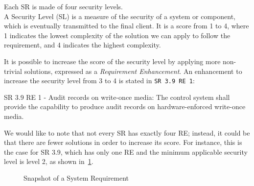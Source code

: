 Each SR is made of four security levels. \\
A Security Level (SL) is a measure of the security of a system or component, which is eventually transmitted to the final client. It is a score from 1 to 4, where 1 indicates the lowest complexity of the solution we can apply to follow the requirement, and 4 indicates the highest complexity.~\cite{ixon-practical-guide-iec-62443}

It is possible to increase the score of the security level by applying more non-trivial solutions, expressed as a \textit{Requirement Enhancement}. An enhancement to increase the security level from 3 to 4 is stated in \texttt{SR 3.9 RE 1}:
\begin{mdframed}
  SR 3.9 RE 1 - Audit records on write-once media: The control system shall provide the capability to produce audit records on hardware-enforced write-once media.
\end{mdframed}\label{sr:3-3_3-9_re1}

We would like to note that not every SR has exactly four RE; instead, it could be that there are fewer solutions in order to increase its score. For instance, this is the case for SR 3.9, which has only one RE and the minimum applicable security level is level 2, as shown in~\cref{fig:iec62443_3-3_3_9}.

\begin{figure}[ht]
  \centering
  \caption[Snapshot of a System Requirement]{Snapshot of a System Requirement}
  \label{fig:iec62443_3-3_3_9}
\end{figure}

